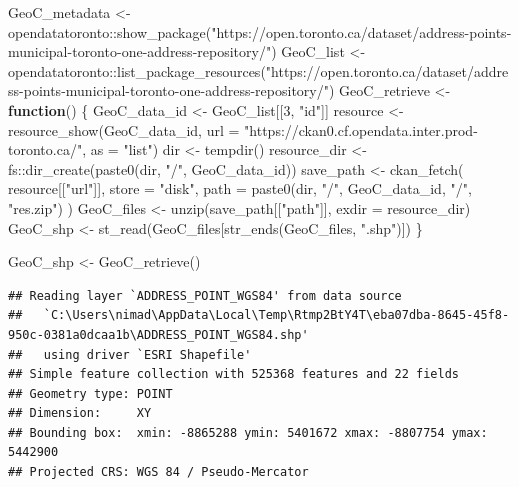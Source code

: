 \documentclass[
]{article}
\newenvironment{Shaded}{\begin{snugshade}}{\end{snugshade}}
\newcommand{\AttributeTok}[1]{\textcolor[rgb]{0.77,0.63,0.00}{#1}}
\newcommand{\ControlFlowTok}[1]{\textcolor[rgb]{0.13,0.29,0.53}{\textbf{#1}}}
\newcommand{\DecValTok}[1]{\textcolor[rgb]{0.00,0.00,0.81}{#1}}
\newcommand{\FunctionTok}[1]{\textcolor[rgb]{0.00,0.00,0.00}{#1}}
\newcommand{\NormalTok}[1]{#1}
\newcommand{\OtherTok}[1]{\textcolor[rgb]{0.56,0.35,0.01}{#1}}
\newcommand{\SpecialCharTok}[1]{\textcolor[rgb]{0.00,0.00,0.00}{#1}}
\newcommand{\StringTok}[1]{\textcolor[rgb]{0.31,0.60,0.02}{#1}}
\begin{document}
\begin{Shaded}
\begin{Highlighting}[]
\NormalTok{GeoC\_metadata }\OtherTok{\textless{}{-}}\NormalTok{ opendatatoronto}\SpecialCharTok{::}\FunctionTok{show\_package}\NormalTok{(}\StringTok{"https://open.toronto.ca/dataset/address{-}points{-}municipal{-}toronto{-}one{-}address{-}repository/"}\NormalTok{)}
\NormalTok{GeoC\_list }\OtherTok{\textless{}{-}}\NormalTok{ opendatatoronto}\SpecialCharTok{::}\FunctionTok{list\_package\_resources}\NormalTok{(}\StringTok{"https://open.toronto.ca/dataset/address{-}points{-}municipal{-}toronto{-}one{-}address{-}repository/"}\NormalTok{)}
\NormalTok{GeoC\_retrieve }\OtherTok{\textless{}{-}} \ControlFlowTok{function}\NormalTok{() \{}
\NormalTok{  GeoC\_data\_id }\OtherTok{\textless{}{-}}\NormalTok{ GeoC\_list[[}\DecValTok{3}\NormalTok{, }\StringTok{"id"}\NormalTok{]]}
\NormalTok{  resource }\OtherTok{\textless{}{-}}
    \FunctionTok{resource\_show}\NormalTok{(GeoC\_data\_id, }\AttributeTok{url =} \StringTok{"https://ckan0.cf.opendata.inter.prod{-}toronto.ca/"}\NormalTok{, }\AttributeTok{as =} \StringTok{"list"}\NormalTok{)}
\NormalTok{  dir }\OtherTok{\textless{}{-}} \FunctionTok{tempdir}\NormalTok{()}
\NormalTok{  resource\_dir }\OtherTok{\textless{}{-}}\NormalTok{ fs}\SpecialCharTok{::}\FunctionTok{dir\_create}\NormalTok{(}\FunctionTok{paste0}\NormalTok{(dir, }\StringTok{"/"}\NormalTok{, GeoC\_data\_id))}
\NormalTok{  save\_path }\OtherTok{\textless{}{-}}
    \FunctionTok{ckan\_fetch}\NormalTok{(}
\NormalTok{      resource[[}\StringTok{"url"}\NormalTok{]],}
      \AttributeTok{store =} \StringTok{"disk"}\NormalTok{,}
      \AttributeTok{path =} \FunctionTok{paste0}\NormalTok{(dir, }\StringTok{"/"}\NormalTok{, GeoC\_data\_id, }\StringTok{"/"}\NormalTok{, }\StringTok{"res.zip"}\NormalTok{)}
\NormalTok{    )}
\NormalTok{  GeoC\_files }\OtherTok{\textless{}{-}} \FunctionTok{unzip}\NormalTok{(save\_path[[}\StringTok{"path"}\NormalTok{]], }\AttributeTok{exdir =}\NormalTok{ resource\_dir)}
\NormalTok{  GeoC\_shp }\OtherTok{\textless{}{-}} \FunctionTok{st\_read}\NormalTok{(GeoC\_files[}\FunctionTok{str\_ends}\NormalTok{(GeoC\_files, }\StringTok{".shp"}\NormalTok{)])}
\NormalTok{\}}

\NormalTok{GeoC\_shp }\OtherTok{\textless{}{-}} \FunctionTok{GeoC\_retrieve}\NormalTok{()}
\end{Highlighting}
\end{Shaded}

\begin{verbatim}
## Reading layer `ADDRESS_POINT_WGS84' from data source 
##   `C:\Users\nimad\AppData\Local\Temp\Rtmp2BtY4T\eba07dba-8645-45f8-950c-0381a0dcaa1b\ADDRESS_POINT_WGS84.shp' 
##   using driver `ESRI Shapefile'
## Simple feature collection with 525368 features and 22 fields
## Geometry type: POINT
## Dimension:     XY
## Bounding box:  xmin: -8865288 ymin: 5401672 xmax: -8807754 ymax: 5442900
## Projected CRS: WGS 84 / Pseudo-Mercator
\end{verbatim}
\end{document}
